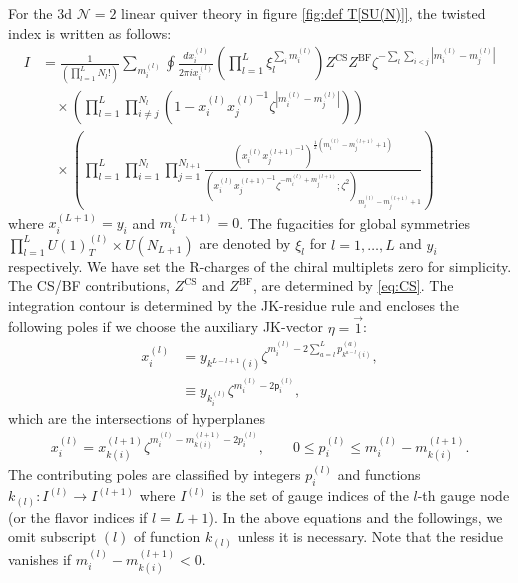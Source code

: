 \documentclass[a4paper,11pt]{article}
\begin{document}
For the 3d $\mathcal N = 2$ linear quiver theory in figure \ref{fig:def T[SU(N)]}, the twisted index is written as follows:
\begin{align}
\label{eq:N=2 tind}
%
I &= \frac{1}{\left(\prod_{l = 1}^L N_l !\right)}\sum_{m^{(l)}_i} \oint \frac{dx^{(l)}_i}{2 \pi i x^{(l)}_i} \left(\prod_{l = 1}^L \xi_l^{\sum_i m^{(l)}_i}\right) Z^\text{CS} Z^\text{BF} \zeta^{-\sum_l \sum_{i < j} |m^{(l)}_i-m^{(l)}_j|} \nonumber \\
%
&\quad \times \left(\prod_{l = 1}^L \prod_{i \neq j}^{N_l} \left(1-x^{(l)}_i {x^{(l)}_j}^{-1} \zeta^{|m^{(l)}_i-m^{(l)}_j|}\right)\right) \nonumber \\
%
&\quad \times \left(\prod_{l = 1}^L \prod_{i = 1}^{N_l} \prod_{j = 1}^{N_{l+1}} \frac{\left(x^{(l)}_i {x^{(l+1)}_j}^{-1}\right)^{\frac{1}{2} (m^{(l)}_i-m^{(l+1)}_j+1)}}{\left(x^{(l)}_i {x^{(l+1)}_j}^{-1} \zeta^{-m^{(l)}_i+m^{(l+1)}_j};\zeta^2\right)_{m^{(l)}_i-m^{(l+1)}_j+1}}\right)
%
\end{align}
where $x^{(L+1)}_i = y_i$ and $m^{(L+1)}_i = 0$. The fugacities for global symmetries $\prod_{l = 1}^L U(1)_T^{(l)} \times U(N_{L+1})$ are denoted by $\xi_l$ for $l = 1,\ldots,L$ and $y_i$ respectively. We have set the R-charges of the chiral multiplets zero for simplicity. The CS/BF contributions, $Z^\text{CS}$ and $Z^\text{BF}$, are determined by \eqref{eq:CS}. The integration contour is determined by the JK-residue rule and encloses the following poles if we choose the auxiliary JK-vector $\eta = \vec 1$:
\begin{align}
x^{(l)}_i &= y_{k^{L-l+1}(i)} \zeta^{m^{(l)}_i-2 \sum_{a = l}^L p^{(a)}_{k^{a-l}(i)}}, \\
&\equiv y_{k^{(l)}_i} \zeta^{m^{(l)}_i-2 \mathsf p^{(l)}_i}, \label{eq:pole}
\end{align}
which are the intersections of hyperplanes
\begin{align}
x^{(l)}_i = x^{(l+1)}_{k(i)} \zeta^{m^{(l)}_i-m^{(l+1)}_{k(i)}-2 p^{(l)}_i}, \qquad 0 \leq p^{(l)}_i \leq m^{(l)}_i-m^{(l+1)}_{k(i)}.
\end{align}
The contributing poles are classified by integers $p^{(l)}_i$ and functions $k_{(l)}:I^{(l)} \rightarrow I^{(l+1)}$ where $I^{(l)}$ is the set of gauge indices of the $l$-th gauge node (or the flavor indices if $l = L+1$). In the above equations and the followings, we omit subscript $(l)$ of function $k_{(l)}$ unless it is necessary. Note that the residue vanishes if $m^{(l)}_i-m^{(l+1)}_{k(i)} < 0$.
\end{document}
